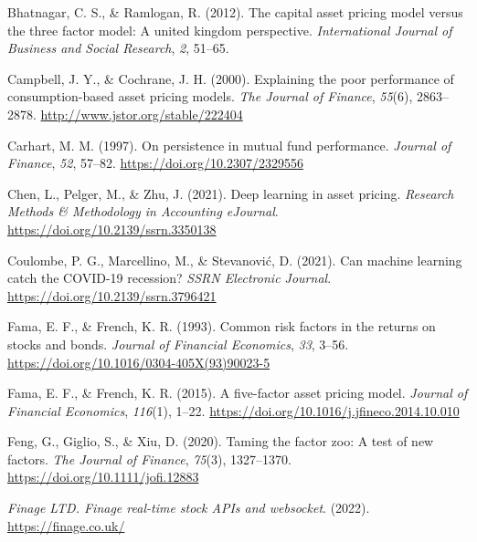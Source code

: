 \documentclass[12pt]{article}
\newlength{\cslhangindent}
\newlength{\cslentryspacingunit} %
\newenvironment{CSLReferences}[2] %
 {%
  \setlength{\parindent}{0pt}
  \ifodd #1
  \let\oldpar\par
  \def\par{\hangindent=\cslhangindent\oldpar}
  \fi
  \setlength{\parskip}{#2\cslentryspacingunit}
 }%
 {}
\begin{document}
\hypertarget{refs}{}
\begin{CSLReferences}{1}{0}
\leavevmode{}%
Bhatnagar, C. S., \& Ramlogan, R. (2012). The capital asset pricing model versus the three factor model: A united kingdom perspective. \emph{International Journal of Business and Social Research}, \emph{2}, 51--65.

\leavevmode{}%
Campbell, J. Y., \& Cochrane, J. H. (2000). Explaining the poor performance of consumption-based asset pricing models. \emph{The Journal of Finance}, \emph{55}(6), 2863--2878. \url{http://www.jstor.org/stable/222404}

\leavevmode{}%
Carhart, M. M. (1997). On persistence in mutual fund performance. \emph{Journal of Finance}, \emph{52}, 57--82. \url{https://doi.org/10.2307/2329556}

\leavevmode{}%
Chen, L., Pelger, M., \& Zhu, J. (2021). Deep learning in asset pricing. \emph{Research Methods \& Methodology in Accounting {eJournal}}. \url{https://doi.org/10.2139/ssrn.3350138}

\leavevmode{}%
Coulombe, P. G., Marcellino, M., \& Stevanović, D. (2021). Can machine learning catch the {COVID}-19 recession? \emph{{SSRN} Electronic Journal}. \url{https://doi.org/10.2139/ssrn.3796421}

\leavevmode{}%
Fama, E. F., \& French, K. R. (1993). Common risk factors in the returns on stocks and bonds. \emph{Journal of Financial Economics}, \emph{33}, 3--56. \url{https://doi.org/10.1016/0304-405X(93)90023-5}

\leavevmode{}%
Fama, E. F., \& French, K. R. (2015). A five-factor asset pricing model. \emph{Journal of Financial Economics}, \emph{116}(1), 1--22. \url{https://doi.org/10.1016/j.jfineco.2014.10.010}

\leavevmode{}%
Feng, G., Giglio, S., \& Xiu, D. (2020). Taming the factor zoo: A test of new factors. \emph{The Journal of Finance}, \emph{75}(3), 1327--1370. \url{https://doi.org/10.1111/jofi.12883}

\leavevmode{}%
\emph{Finage {LTD}. Finage {\textbar} real-time stock {APIs} and websocket}. (2022). \url{https://finage.co.uk/}


\end{CSLReferences}
\end{document}
